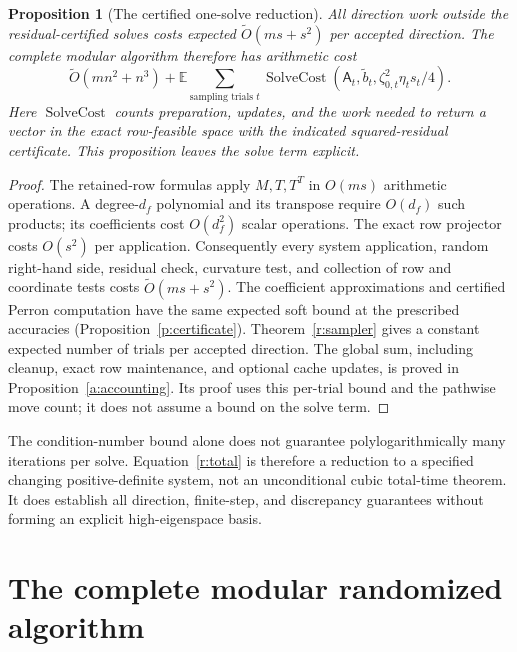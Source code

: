 \documentclass[11pt]{amsart}
\newtheorem{proposition}[theorem]{Proposition}
\theoremstyle{definition}\newtheorem{definition}[theorem]{Definition}
\theoremstyle{remark}\newtheorem{remark}[theorem]{Remark}
\numberwithin{equation}{section}
\begin{document}
\begin{proposition}[The certified one-solve reduction]\label{r:cost}
All direction work outside the residual-certified solves costs expected
$\widetilde O(ms+s^2)$ per accepted direction. The complete modular
algorithm therefore has arithmetic cost
\begin{equation}\label{r:total}
 \widetilde O(mn^2+n^3)
 +\mathbb E\sum_{\text{sampling trials }t}
   \operatorname{SolveCost}\!\left(
       \mathsf{A}_t,\widetilde b_t,\zeta_{0,t}^2\eta_ts_t/4\right).
\end{equation}
Here $\operatorname{SolveCost}$ counts preparation, updates, and the work
needed to return a vector in the exact row-feasible space with the
indicated squared-residual certificate. This proposition leaves the solve term explicit.
\end{proposition}
\begin{proof}
The retained-row formulas apply $M,T,T^T$ in $O(ms)$ arithmetic
operations. A degree-$d_f$ polynomial and its transpose require $O(d_f)$
such products; its coefficients cost $O(d_f^2)$ scalar operations.
The exact row projector costs $O(s^2)$ per application. Consequently
every system application, random right-hand side, residual check,
curvature test, and collection of row and coordinate tests costs
$\widetilde O(ms+s^2)$. The coefficient approximations and certified
Perron computation have the same expected soft bound at the prescribed
accuracies (Proposition~\ref{p:certificate}). Theorem~\ref{r:sampler}
gives a constant expected number of trials per accepted direction.
The global sum, including cleanup, exact row maintenance, and optional
cache updates, is proved in Proposition~\ref{a:accounting}. Its proof
uses this per-trial bound and the pathwise move count; it does not
assume a bound on the solve term.
\end{proof}

The condition-number bound alone does not guarantee polylogarithmically
many iterations per solve. Equation~\eqref{r:total} is therefore a
reduction to a specified changing positive-definite system, not an
unconditional cubic total-time theorem. It does establish all direction,
finite-step, and discrepancy guarantees without forming an explicit
high-eigenspace basis.


\section{The complete modular randomized algorithm}\label{a:algorithm}
\end{document}
